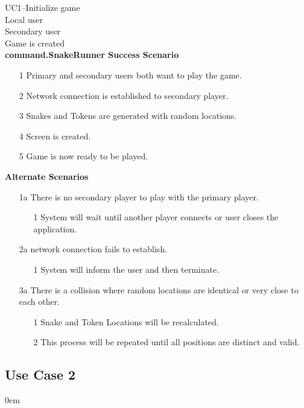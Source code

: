 \documentclass[titlepage]{article}
\begin{document}
			\textbf{} UC1--Initialize game\\
			\textbf{} Local user\\
			\textbf{} Secondary user\\
			\textbf{} Game is created\\
			\textbf{command.SnakeRunner Success Scenario}
				\begin{enumerate}
					\itemsep0em 
					\item[1] Primary and secondary users both want to play the game.
					\item[2] Network connection is established to secondary player.
					\item[3] Snakes and Tokens are generated with random locations.
					\item[4] Screen is created.
					\item[5] Game is now ready to be played.
				\end{enumerate}
			\textbf{Alternate Scenarios}
			\begin{enumerate}
									\itemsep0em 
				\item[1a]There is no secondary player to play with the primary player.
				\begin{enumerate}
										\itemsep0em 
					\item[1]System will wait until another player connects or user closes the application.
				\end{enumerate}
				\item[2a]network connection fails to establish.
				\begin{enumerate}
										\itemsep0em 
					\item[1]System will inform the user and then terminate.
				\end{enumerate}
				\item[3a]There is a collision where random locations are identical or very close to each other.
				\begin{enumerate}
										\itemsep0em 
					\item[1]Snake and Token Locations will be recalculated.
					\item[2]This process will be repeated until all positions are distinct and valid.
				\end{enumerate}
			\end{enumerate}
		
	\subsection{Use Case 2}
	\itemsep0em 
	
\end{document}
